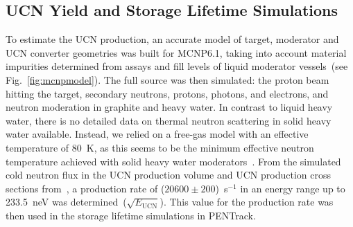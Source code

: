 

\subsection{UCN Yield and Storage Lifetime Simulations~\label{sec:yieldsims}}
To estimate the UCN production, an accurate model of target, moderator
and UCN converter geometries was built for MCNP6.1, taking into
account material impurities determined from assays and fill levels of
liquid moderator vessels~(see Fig.~\ref{fig:mcnpmodel}). The full
source was then simulated: the proton beam hitting the target,
secondary neutrons, protons, photons, and electrons, and neutron
moderation in graphite and heavy water. In contrast to liquid heavy
water, there is no detailed data on thermal neutron scattering in
solid heavy water available. Instead, we relied on a free-gas model
with an effective temperature of 80~K, as this seems to be the minimum
effective neutron temperature achieved with solid heavy water
moderators~\cite{rush1966}. From the simulated cold neutron flux in
the UCN production volume and UCN production cross sections
from~\cite{Schmidt2015,Korobkina2002}, a production rate of
($20600\pm 200$)~s$^{-1}$ in an energy range up to 233.5~neV was
determined~($\sqrt{E_\mathrm{UCN}}$). This value for the production
rate was then used in the storage lifetime simulations in PENTrack.

